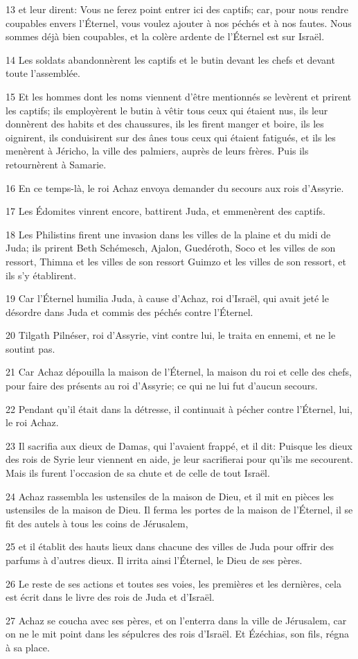 \par 13 et leur dirent: Vous ne ferez point entrer ici des captifs; car, pour nous rendre coupables envers l'Éternel, vous voulez ajouter à nos péchés et à nos fautes. Nous sommes déjà bien coupables, et la colère ardente de l'Éternel est sur Israël.
\par 14 Les soldats abandonnèrent les captifs et le butin devant les chefs et devant toute l'assemblée.
\par 15 Et les hommes dont les noms viennent d'être mentionnés se levèrent et prirent les captifs; ils employèrent le butin à vêtir tous ceux qui étaient nus, ils leur donnèrent des habits et des chaussures, ils les firent manger et boire, ils les oignirent, ils conduisirent sur des ânes tous ceux qui étaient fatigués, et ils les menèrent à Jéricho, la ville des palmiers, auprès de leurs frères. Puis ils retournèrent à Samarie.
\par 16 En ce temps-là, le roi Achaz envoya demander du secours aux rois d'Assyrie.
\par 17 Les Édomites vinrent encore, battirent Juda, et emmenèrent des captifs.
\par 18 Les Philistins firent une invasion dans les villes de la plaine et du midi de Juda; ils prirent Beth Schémesch, Ajalon, Guedéroth, Soco et les villes de son ressort, Thimna et les villes de son ressort Guimzo et les villes de son ressort, et ils s'y établirent.
\par 19 Car l'Éternel humilia Juda, à cause d'Achaz, roi d'Israël, qui avait jeté le désordre dans Juda et commis des péchés contre l'Éternel.
\par 20 Tilgath Pilnéser, roi d'Assyrie, vint contre lui, le traita en ennemi, et ne le soutint pas.
\par 21 Car Achaz dépouilla la maison de l'Éternel, la maison du roi et celle des chefs, pour faire des présents au roi d'Assyrie; ce qui ne lui fut d'aucun secours.
\par 22 Pendant qu'il était dans la détresse, il continuait à pécher contre l'Éternel, lui, le roi Achaz.
\par 23 Il sacrifia aux dieux de Damas, qui l'avaient frappé, et il dit: Puisque les dieux des rois de Syrie leur viennent en aide, je leur sacrifierai pour qu'ils me secourent. Mais ils furent l'occasion de sa chute et de celle de tout Israël.
\par 24 Achaz rassembla les ustensiles de la maison de Dieu, et il mit en pièces les ustensiles de la maison de Dieu. Il ferma les portes de la maison de l'Éternel, il se fit des autels à tous les coins de Jérusalem,
\par 25 et il établit des hauts lieux dans chacune des villes de Juda pour offrir des parfums à d'autres dieux. Il irrita ainsi l'Éternel, le Dieu de ses pères.
\par 26 Le reste de ses actions et toutes ses voies, les premières et les dernières, cela est écrit dans le livre des rois de Juda et d'Israël.
\par 27 Achaz se coucha avec ses pères, et on l'enterra dans la ville de Jérusalem, car on ne le mit point dans les sépulcres des rois d'Israël. Et Ézéchias, son fils, régna à sa place.

